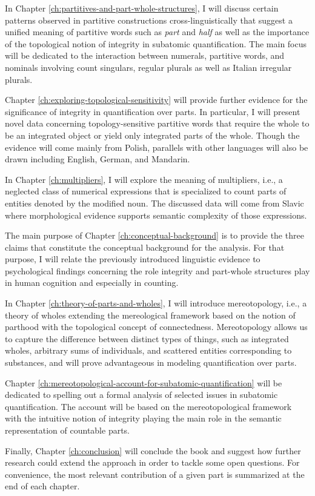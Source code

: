 In Chapter \ref{ch:partitives-and-part-whole-structures}, I will discuss certain patterns observed in partitive constructions cross-linguistically that suggest a unified meaning of partitive words such as \textit{part} and \textit{half} as well as the importance of the topological notion of integrity in subatomic quantification. The main focus will be dedicated to the interaction between numerals, partitive words, and nominals involving count singulars, regular plurals as well as Italian irregular plurals. 

Chapter \ref{ch:exploring-topological-sensitivity} will provide further evidence for the significance of integrity in quantification over parts. In particular, I will present novel data concerning topo\-logy-sensitive partitive words that require the whole to be an integrated object or yield only integrated parts of the whole. Though the evidence will come mainly from Polish, parallels with other languages will also be drawn including English, German, and Mandarin. 

In Chapter \ref{ch:multipliers}, I will explore the meaning of multipliers, i.e., a neglected class of numerical expressions that is specialized to count parts of entities denoted by the modified noun. The discussed data will come from Slavic where morphological evidence supports semantic complexity of those expressions. 

The main purpose of Chapter \ref{ch:conceptual-background} is to provide the three claims that constitute the conceptual background for the analysis. For that purpose, I will relate the previously introduced linguistic evidence to psychological findings concerning the role integrity and part-whole structures play in human cognition and especially in counting. 

In Chapter \ref{ch:theory-of-parts-and-wholes}, I will introduce mereotopology, i.e., a theory of wholes extending the mereological framework based on the notion of parthood with the topological concept of connectedness. Mereotopology allows us to capture the difference between distinct types of things, such as integrated wholes, arbitrary sums of individuals, and scattered entities corresponding to substances, and will prove advantageous in modeling quantification over parts. 

Chapter \ref{ch:mereotopological-account-for-subatomic-quantification} will be dedicated to spelling out a formal analysis of selected issues in subatomic quantification. The account will be based on the mereotopological framework with the intuitive notion of integrity playing the main role in the semantic representation of countable parts. 

Finally, Chapter \ref{ch:conclusion} will conclude the book and suggest how further research could extend the approach in order to tackle some open questions. For convenience, the most relevant contribution of a given part is summarized at the end of each chapter.


